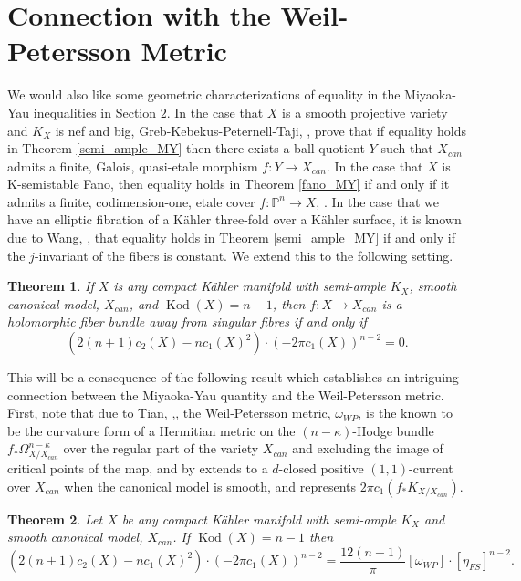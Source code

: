 \documentclass[12pt]{article}
\newtheorem{theorem}{Theorem}[section]
\numberwithin{equation}{section}
\renewcommand{\P}{\mathbb{P}}
\DeclareMathOperator{\Kod}{Kod}
\begin{document}
\section{Connection with the Weil-Petersson Metric}

\noindent We would also like some geometric characterizations of equality in the Miyaoka-Yau inequalities in Section $2$. In the case that $X$ is a smooth projective variety and $K_X$ is nef and big, Greb-Kebekus-Peternell-Taji, \cite{GKPT19}, prove that if equality holds in Theorem \ref{semi_ample_MY} then there exists a ball quotient $Y$ such that $X_{can}$ admits a finite, Galois, quasi-etale morphism $f: Y \to X_{can}$. In the case that $X$ is K-semistable Fano, then equality holds in Theorem \ref{fano_MY} if and only if it admits a finite, codimension-one, etale cover $f: \P^n \to X$, \cite{H24}. In the case that we have an elliptic fibration of a K\"ahler three-fold over a K\"ahler surface, it is known due to Wang, \cite{W26}, that equality holds in Theorem \ref{semi_ample_MY} if and only if the $j$-invariant of the fibers is constant. We extend this to the following setting.

\begin{theorem}\label{MY_equality}
If $X$ is any compact K\"ahler manifold with semi-ample $K_X$, smooth canonical model, $X_{can}$, and $\Kod(X) = n-1$, then $f: X \to X_{can}$ is a holomorphic fiber bundle away from singular fibres if and only if 
\begin{equation*}
    (2(n+1) c_2(X) - n c_1(X)^2) \cdot(- 2 \pi c_1(X))^{n-2} = 0.
\end{equation*}
\end{theorem}

\noindent This will be a consequence of the following result which establishes an intriguing connection between the Miyaoka-Yau quantity and the Weil-Petersson metric. First, note that due to Tian, \cite{T87},\cite[Eqn. (3.18)]{ST12}, the Weil-Petersson metric, $\omega_{WP}$, is the known to be the curvature form of a Hermitian metric on the $(n-\kappa)$-Hodge bundle $f_* \Omega^{n-\kappa}_{X/X_{can}}$ over the regular part of the variety $X_{can}$ and excluding the image of critical points of the map, and by \cite{CS21} extends to a $d$-closed positive $(1,1)$-current over $X_{can}$ when the canonical model is smooth, and represents $2 \pi c_1(f_* K_{X/X_{can}})$.

\begin{theorem}\label{MY_WP}
Let $X$ be any compact K\"ahler manifold with semi-ample $K_X$ and smooth canonical model, $X_{can}$. If $\Kod(X) = n-1$ then
\begin{equation*}
    (2(n+1) c_2(X) - n c_1(X)^2) \cdot (-2 \pi c_1(X))^{n-2} = \frac{12(n+1)}{\pi}[\omega_{WP}] \cdot [\eta_{FS}]^{n-2}.
\end{equation*}
\end{theorem}
\end{document}
